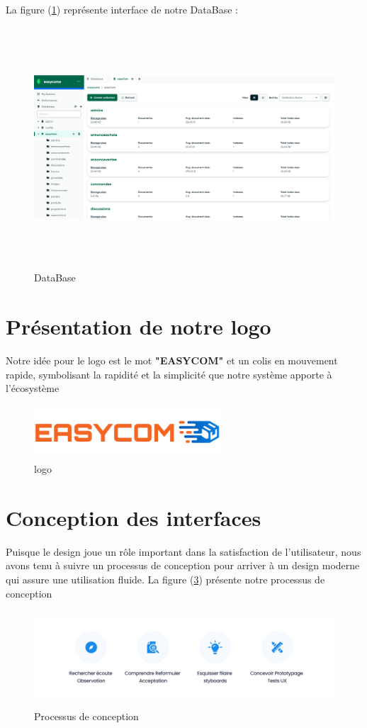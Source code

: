 \documentclass[edit,12pt,a4paper,ChapStyle,oneside,doubleinterligne]{report}
\begin{document}
La figure (\ref{fig:db}) représente interface de notre DataBase :
\begin{figure} [H]
    \centering
    \includegraphics[width=15.742708333cm , height = 9cm , angle=360]{images/easycomdb.png}
    \caption{DataBase}
    \label{fig:db}
\end{figure}
\section{Présentation de notre logo}
Notre idée pour le logo est le mot \textbf{"EASYCOM"} et un colis en mouvement rapide, symbolisant la rapidité et la simplicité que notre système apporte à l'écosystème
\begin{figure}[H] 
    \centering
    \includegraphics[width=7cm , height = 2cm , angle=360]{images/logo.png}
    \caption{logo}
    \label{fig:logo}
\end{figure}
\section{Conception des interfaces }
Puisque le design joue un rôle important dans la satisfaction de l'utilisateur, nous avons tenu à suivre un processus de conception pour arriver à un design moderne qui assure une utilisation fluide.
 La figure (\ref{fig:processe}) présente notre processus de conception
 
  \begin{figure} [H]
    \centering
    \includegraphics[width=13.335cm , height = 3.59cm , angle=360]{images/processe.png}
    \caption{Processus de conception}
    \label{fig:processe}
\end{figure}
\end{document}
